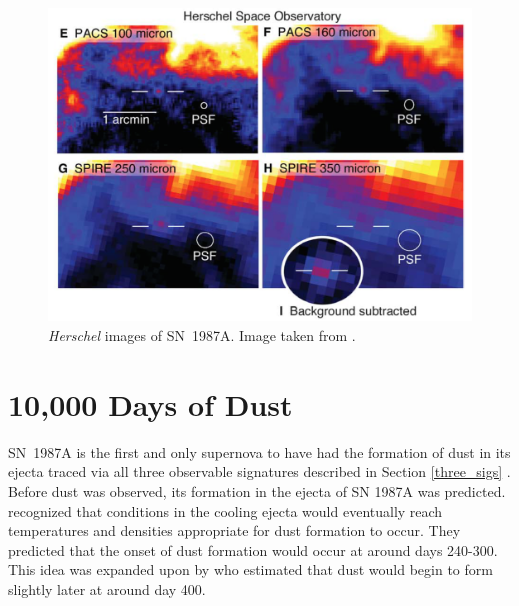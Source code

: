 \begin{figure}
\centering
\includegraphics[clip=true,scale=0.35,trim= 0 0 0 0]{chapters/chapter5/images/Herschel_img.png}
\caption{\textit{Herschel} images of SN~1987A.  Image taken from \citep{Matsuura2011}.}
\label{Herschel_img}
\end{figure}

\section{10,000 Days of Dust}
SN~1987A is the first and only supernova to have had the formation of dust in its ejecta traced via all three observable signatures described in Section \ref{three_sigs} \citep{Bouchet2014}.  Before dust was observed, its formation in the ejecta of SN 1987A was predicted.  \citet{Gehrz1987} recognized that conditions in the cooling ejecta would eventually reach temperatures and densities appropriate for dust formation to occur.  They predicted that the onset of dust formation would occur at around days 240-300.  This idea was expanded upon by \citet{Dwek1988} who estimated that dust would begin to form slightly later at around day 400.

